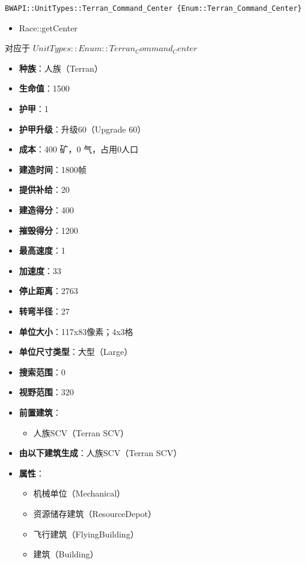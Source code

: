 \begin{tcolorbox}[colback=white, colframe=black!60!white, title=Terran\_Command\_Center(), arc=0mm]
    \begin{verbatim}
BWAPI::UnitTypes::Terran_Command_Center {Enum::Terran_Command_Center}
    \end{verbatim}
    \begin{refer}
        \begin{itemize}
            \item Race::getCenter
        \end{itemize}
    \end{refer}
    对应于  $ UnitTypes::Enum::Terran_Command_Center $ 
    \begin{itemize}
        \item \textbf{种族}：人族（Terran）
        \item \textbf{生命值}：1500
        \item \textbf{护甲}：1
        \item \textbf{护甲升级}：升级60（Upgrade 60）
        \item \textbf{成本}：400 矿，0 气，占用0人口
        \item \textbf{建造时间}：1800帧
        \item \textbf{提供补给}：20
        \item \textbf{建造得分}：400
        \item \textbf{摧毁得分}：1200
        \item \textbf{最高速度}：1
        \item \textbf{加速度}：33
        \item \textbf{停止距离}：2763
        \item \textbf{转弯半径}：27
        \item \textbf{单位大小}：117x83像素；4x3格
        \item \textbf{单位尺寸类型}：大型（Large）
        \item \textbf{搜索范围}：0
        \item \textbf{视野范围}：320
        \item \textbf{前置建筑}：
            \begin{itemize}
                \item 人族SCV（Terran SCV）
            \end{itemize}
        \item \textbf{由以下建筑生成}：人族SCV（Terran SCV）
        \item \textbf{属性}：
            \begin{itemize}
                \item 机械单位（Mechanical）
                \item 资源储存建筑（ResourceDepot）
                \item 飞行建筑（FlyingBuilding）
                \item 建筑（Building）
            \end{itemize}
    \end{itemize}
\end{tcolorbox}

